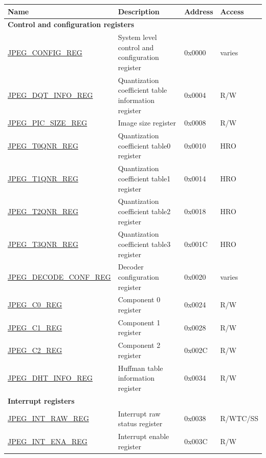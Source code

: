 \begin{longtable}{ | p{6cm} | p{6.8cm} | p{1.3cm} | p{1.4cm} | }
\hline\rowcolor{lightgray}
\textbf{Name} & \textbf{Description} &  \textbf{Address} & \textbf{Access} \\ \hline
\endhead
\multicolumn{4}{|l|}{\textbf{Control and configuration registers}} \\ \hline
\hyperref[regdesc:JPEGCONFIGREG]{JPEG\_CONFIG\_REG} & System level control and configuration register & 0x0000 & varies \\ \hline
\hyperref[regdesc:JPEGDQTINFOREG]{JPEG\_DQT\_INFO\_REG} & Quantization coefficient table information register & 0x0004 & R/W \\ \hline
\hyperref[regdesc:JPEGPICSIZEREG]{JPEG\_PIC\_SIZE\_REG} & Image size register & 0x0008 & R/W \\ \hline
\hyperref[regdesc:JPEGT0QNRREG]{JPEG\_T0QNR\_REG} & Quantization coefficient table0 register & 0x0010 & HRO \\ \hline
\hyperref[regdesc:JPEGT1QNRREG]{JPEG\_T1QNR\_REG} & Quantization coefficient table1 register & 0x0014 & HRO \\ \hline
\hyperref[regdesc:JPEGT2QNRREG]{JPEG\_T2QNR\_REG} & Quantization coefficient table2 register & 0x0018 & HRO \\ \hline
\hyperref[regdesc:JPEGT3QNRREG]{JPEG\_T3QNR\_REG} & Quantization coefficient table3 register & 0x001C & HRO \\ \hline
\hyperref[regdesc:JPEGDECODECONFREG]{JPEG\_DECODE\_CONF\_REG} & Decoder configuration register & 0x0020 & varies \\ \hline
\hyperref[regdesc:JPEGC0REG]{JPEG\_C0\_REG} & Component 0 register & 0x0024 & R/W \\ \hline
\hyperref[regdesc:JPEGC1REG]{JPEG\_C1\_REG} & Component 1 register & 0x0028 & R/W \\ \hline
\hyperref[regdesc:JPEGC2REG]{JPEG\_C2\_REG} & Component 2 register & 0x002C & R/W \\ \hline
\hyperref[regdesc:JPEGDHTINFOREG]{JPEG\_DHT\_INFO\_REG} & Huffman table information register & 0x0034 & R/W \\ \hline
\multicolumn{4}{|l|}{\textbf{Interrupt registers}} \\ \hline
\hyperref[regdesc:JPEGINTRAWREG]{JPEG\_INT\_RAW\_REG} & Interrupt raw status register & 0x0038 & R/WTC/SS \\ \hline
\hyperref[regdesc:JPEGINTENAREG]{JPEG\_INT\_ENA\_REG} & Interrupt enable register & 0x003C & R/W \\ \hline

\end{longtable}
